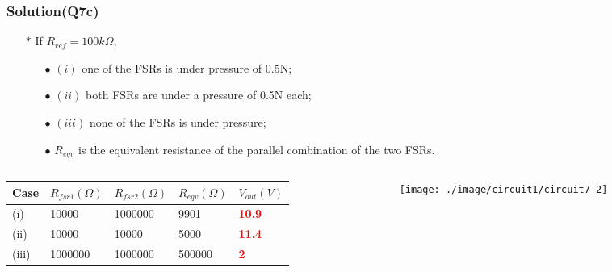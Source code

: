 \documentclass{beamer}
\newcommand{\red}[1]{\textcolor{red}{#1}}
\begin{document}
\begin{frame}
\frametitle{Solution(Q7c)}
\begin{itemize} \itemsep1pt \parskip0pt 
  \item[$\ast$] If $R_{ref} = 100k \Omega$,
  \begin{itemize} \itemsep1pt \parskip0pt 
  \item[$\bullet$] $(i)$ one of the FSRs is under pressure of 0.5N;
  \item[$\bullet$] $(ii)$ both FSRs are under a pressure of 0.5N each;
  \item[$\bullet$] $(iii)$ none of the FSRs is under pressure;
  \item[$\bullet$] $R_{eqv}$ is the equivalent resistance of the parallel combination of the two FSRs.
  \end{itemize}
\end{itemize}
\begin{columns}
\begin{column}{8.5cm}
\begin{table}
\begin{tabular}{l l l l l}
\toprule
\textbf{Case} & \textbf{$R_{fsr1}(\Omega)$} & \textbf{$R_{fsr2}(\Omega)$} & \textbf{$R_{eqv}(\Omega)$} & \textbf{$V_{out}(V)$}\\
\midrule
(i)   & 10000   & 1000000 & 9901   & \red{{\bf 10.9}} \\
(ii)  & 10000   & 10000   & 5000   & \red{{\bf 11.4}} \\
(iii) & 1000000 & 1000000 & 500000 & \red{{\bf 2}} \\
\bottomrule
\end{tabular}

\end{table}

\end{column}


\begin{column}{4cm}
\begin{figure}[H]
  \centering
  \texttt{[image: ./image/circuit1/circuit7\_2]}
\end{figure}
\end{column}


\end{columns}

\end{frame}

\end{document}
